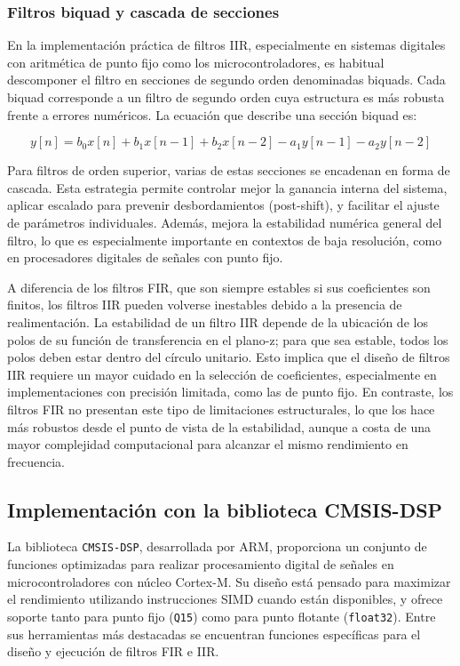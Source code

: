 \documentclass[12pt]{article}
\begin{document}
	\subsubsection{Filtros biquad y cascada de secciones}
	En la implementación práctica de filtros IIR, especialmente en sistemas digitales con aritmética de punto fijo como los microcontroladores, es habitual descomponer el filtro en secciones de segundo orden denominadas biquads. Cada biquad corresponde a un filtro de segundo orden cuya estructura es más robusta frente a errores numéricos. La ecuación que describe una sección biquad es:
	
	\begin{equation}
		y[n] = b_0 x[n] + b_1 x[n-1] + b_2 x[n-2] - a_1 y[n-1] - a_2 y[n-2]
	\end{equation}
	
	Para filtros de orden superior, varias de estas secciones se encadenan en forma de cascada. Esta estrategia permite controlar mejor la ganancia interna del sistema, aplicar escalado para prevenir desbordamientos (post-shift), y facilitar el ajuste de parámetros individuales. Además, mejora la estabilidad numérica general del filtro, lo que es especialmente importante en contextos de baja resolución, como en procesadores digitales de señales con punto fijo.\newpage
	
	A diferencia de los filtros FIR, que son siempre estables si sus coeficientes son finitos, los filtros IIR pueden volverse inestables debido a la presencia de realimentación. La estabilidad de un filtro IIR depende de la ubicación de los polos de su función de transferencia en el plano-z; para que sea estable, todos los polos deben estar dentro del círculo unitario. Esto implica que el diseño de filtros IIR requiere un mayor cuidado en la selección de coeficientes, especialmente en implementaciones con precisión limitada, como las de punto fijo. En contraste, los filtros FIR no presentan este tipo de limitaciones estructurales, lo que los hace más robustos desde el punto de vista de la estabilidad, aunque a costa de una mayor complejidad computacional para alcanzar el mismo rendimiento en frecuencia.
	
	\subsection{Implementación con la biblioteca CMSIS-DSP}
	
	La biblioteca \texttt{CMSIS-DSP}, desarrollada por ARM, proporciona un conjunto de funciones optimizadas para realizar procesamiento digital de señales en microcontroladores con núcleo Cortex-M. Su diseño está pensado para maximizar el rendimiento utilizando instrucciones SIMD cuando están disponibles, y ofrece soporte tanto para punto fijo (\texttt{Q15}) como para punto flotante (\texttt{float32}). Entre sus herramientas más destacadas se encuentran funciones específicas para el diseño y ejecución de filtros FIR e IIR.
	
\end{document}
